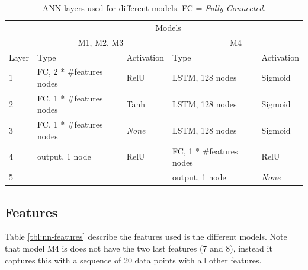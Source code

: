 \begin{table}[H]
  \centering
  \caption{ANN layers used for different models. FC = \textit{Fully Connected}.}
  \label{tbl:nn-layers}
  \begin{tabular}{l|l|l|l|l}
        & \multicolumn{4}{c}{Models}                                                                                           \\ \cline{2-5} 
        & \multicolumn{2}{c|}{M1, M2, M3}                           & \multicolumn{2}{c}{M4}                                   \\ \hline
  Layer & Type                     & Activation                     & Type                     & Activation                     \\ \hline
  1     & FC, 2 * \#features nodes & RelU                           & LSTM, 128 nodes          & Sigmoid                        \\
  2     & FC, 1 * \#features nodes & Tanh                           & LSTM, 128 nodes          & Sigmoid                        \\
  3     & FC, 1 * \#features nodes & \textit{None} & LSTM, 128 nodes          & Sigmoid                        \\
  4     & output, 1 node           & RelU                           & FC, 1 * \#features nodes & RelU                           \\
  5     &                          &                                & output, 1 node           & \textit{None}
  \end{tabular}
  \end{table}

\subsection{Features}
Table \ref{tbl:nn-features} describe the features used is the different models. Note that model M4 is does not have the two last features (7 and 8), instead it captures this with a sequence of 20 data points with all other features.

